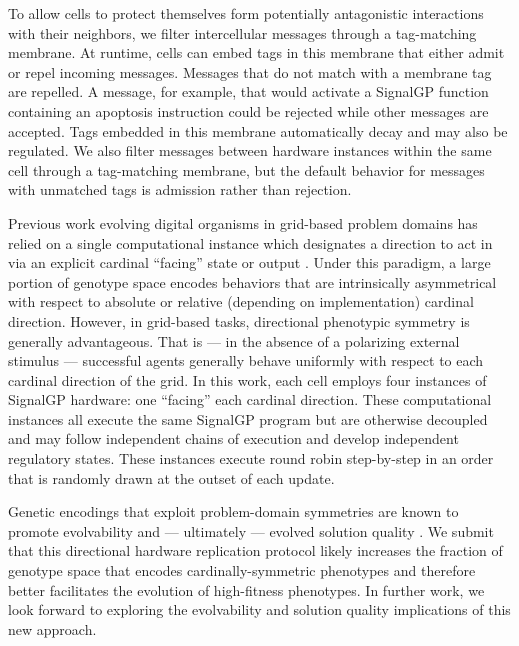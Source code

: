 To allow cells to protect themselves form potentially antagonistic interactions with their neighbors, we filter intercellular messages through a tag-matching membrane.
At runtime, cells can embed tags in this membrane that either admit or repel incoming messages.
Messages that do not match with a membrane tag are repelled.
A message, for example, that would activate a SignalGP function containing an apoptosis instruction could be rejected while other messages are accepted.
Tags embedded in this membrane automatically decay and may also be regulated.
We also filter messages between hardware instances within the same cell through a tag-matching membrane, but the default behavior for messages with unmatched tags is admission rather than rejection.

Previous work evolving digital organisms in grid-based problem domains has relied on a single computational instance which designates a direction to act in via an explicit cardinal ``facing'' state or output \cite{goldsby2014evolutionary, goldsby2018serendipitous, grabowski2010early, biswas2014causes, lalejini2018evolving}.
Under this paradigm, a large portion of genotype space encodes behaviors that are intrinsically asymmetrical with respect to absolute or relative (depending on implementation) cardinal direction.
However, in grid-based tasks, directional phenotypic symmetry is generally advantageous.
That is --- in the absence of a polarizing external stimulus --- successful agents generally behave uniformly with respect to each cardinal direction of the grid.
In this work, each cell employs four instances of SignalGP hardware: one ``facing'' each cardinal direction.
These computational instances all execute the same SignalGP program but are otherwise decoupled and may follow independent chains of execution and develop independent regulatory states.
These instances execute round robin step-by-step in an order that is randomly drawn at the outset of each update.

Genetic encodings that exploit problem-domain symmetries are known to promote evolvability and --- ultimately --- evolved solution quality \cite{clune2011performance, cheney2014unshackling}.
We submit that this directional hardware replication protocol likely increases the fraction of genotype space that encodes cardinally-symmetric phenotypes and therefore better facilitates the evolution of high-fitness phenotypes.
In further work, we look forward to exploring the evolvability and solution quality implications of this new approach.

